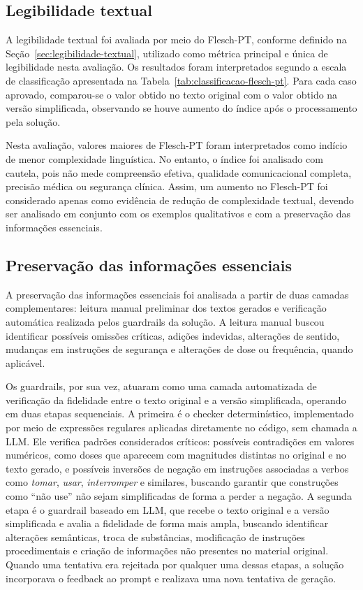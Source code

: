 \subsection{Legibilidade textual}
\label{subsec:legibilidade-textual-avaliacao}

A legibilidade textual foi avaliada por meio do Flesch-PT, conforme definido na Seção~\ref{sec:legibilidade-textual}, utilizado como métrica principal e única de legibilidade nesta avaliação. Os resultados foram interpretados segundo a escala de classificação apresentada na Tabela~\ref{tab:classificacao-flesch-pt}. Para cada caso aprovado, comparou-se o valor obtido no texto original com o valor obtido na versão simplificada, observando se houve aumento do índice após o processamento pela solução.

Nesta avaliação, valores maiores de Flesch-PT foram interpretados como indício de menor complexidade linguística. No entanto, o índice foi analisado com cautela, pois não mede compreensão efetiva, qualidade comunicacional completa, precisão médica ou segurança clínica. Assim, um aumento no Flesch-PT foi considerado apenas como evidência de redução de complexidade textual, devendo ser analisado em conjunto com os exemplos qualitativos e com a preservação das informações essenciais.

\subsection{Preservação das informações essenciais}
\label{subsec:preservacao-informacoes-essenciais-avaliacao}

A preservação das informações essenciais foi analisada a partir de duas camadas complementares: leitura manual preliminar dos textos gerados e verificação automática realizada pelos guardrails da solução. A leitura manual buscou identificar possíveis omissões críticas, adições indevidas, alterações de sentido, mudanças em instruções de segurança e alterações de dose ou frequência, quando aplicável.

Os guardrails, por sua vez, atuaram como uma camada automatizada de verificação da fidelidade entre o texto original e a versão simplificada, operando em duas etapas sequenciais. A primeira é o checker determinístico, implementado por meio de expressões regulares aplicadas diretamente no código, sem chamada a LLM. Ele verifica padrões considerados críticos: possíveis contradições em valores numéricos, como doses que aparecem com magnitudes distintas no original e no texto gerado, e possíveis inversões de negação em instruções associadas a verbos como \textit{tomar}, \textit{usar}, \textit{interromper} e similares, buscando garantir que construções como ``não use'' não sejam simplificadas de forma a perder a negação. A segunda etapa é o guardrail baseado em LLM, que recebe o texto original e a versão simplificada e avalia a fidelidade de forma mais ampla, buscando identificar alterações semânticas, troca de substâncias, modificação de instruções procedimentais e criação de informações não presentes no material original. Quando uma tentativa era rejeitada por qualquer uma dessas etapas, a solução incorporava o feedback ao prompt e realizava uma nova tentativa de geração.

